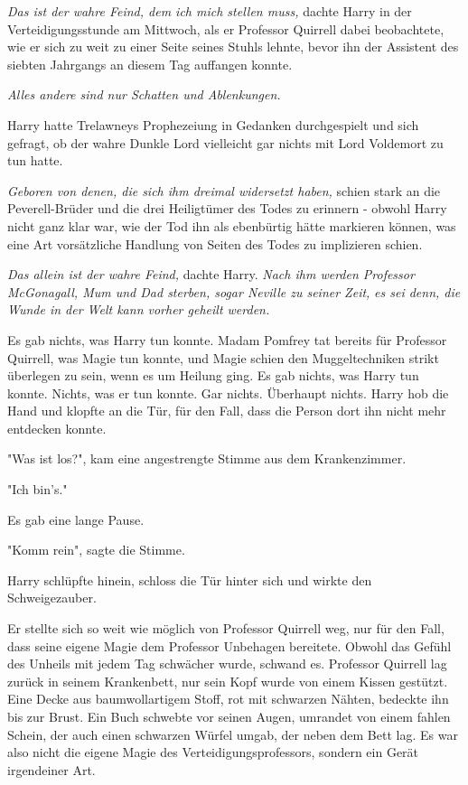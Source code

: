 {\emph{Das ist der wahre Feind, dem ich mich stellen muss,} dachte Harry in der Verteidigungsstunde am Mittwoch, als er Professor Quirrell dabei beobachtete, wie er sich zu weit zu einer Seite seines Stuhls lehnte, bevor ihn der Assistent des siebten Jahrgangs an diesem Tag auffangen konnte.

\emph{Alles andere sind nur Schatten und Ablenkungen.}

Harry hatte Trelawneys Prophezeiung in Gedanken durchgespielt und sich gefragt, ob der wahre Dunkle Lord vielleicht gar nichts mit Lord Voldemort zu tun hatte.

\emph{Geboren von denen, die sich ihm dreimal widersetzt haben,} schien stark an die Peverell-Brüder und die drei Heiligtümer des Todes zu erinnern - obwohl Harry nicht ganz klar war, wie der Tod ihn als ebenbürtig hätte markieren können, was eine Art vorsätzliche Handlung von Seiten des Todes zu implizieren schien.

\emph{Das allein ist der wahre Feind,} dachte Harry. \emph{Nach ihm werden Professor McGonagall, Mum und Dad sterben, sogar Neville zu seiner Zeit,} \emph{es sei denn, die Wunde in der Welt kann vorher geheilt werden.}

Es gab nichts, was Harry tun konnte. Madam Pomfrey tat bereits für Professor Quirrell, was Magie tun konnte, und Magie schien den Muggeltechniken strikt überlegen zu sein, wenn es um Heilung ging. Es gab nichts, was Harry tun konnte. Nichts, was er tun konnte. Gar nichts. Überhaupt nichts. Harry hob die Hand und klopfte an die Tür, für den Fall, dass die Person dort ihn nicht mehr entdecken konnte.

"Was ist los?", kam eine angestrengte Stimme aus dem Krankenzimmer.

"Ich bin's."

Es gab eine lange Pause.

"Komm rein", sagte die Stimme.

Harry schlüpfte hinein, schloss die Tür hinter sich und wirkte den Schweigezauber.

Er stellte sich so weit wie möglich von Professor Quirrell weg, nur für den Fall, dass seine eigene Magie dem Professor Unbehagen bereitete. Obwohl das Gefühl des Unheils mit jedem Tag schwächer wurde, schwand es. Professor Quirrell lag zurück in seinem Krankenbett, nur sein Kopf wurde von einem Kissen gestützt. Eine Decke aus baumwollartigem Stoff, rot mit schwarzen Nähten, bedeckte ihn bis zur Brust. Ein Buch schwebte vor seinen Augen, umrandet von einem fahlen Schein, der auch einen schwarzen Würfel umgab, der neben dem Bett lag. Es war also nicht die eigene Magie des Verteidigungsprofessors, sondern ein Gerät irgendeiner Art.

}
